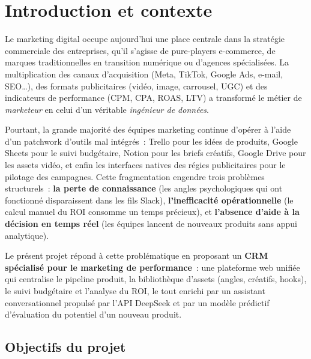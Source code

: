 \section{Introduction et contexte}
\label{sec:intro}

Le marketing digital occupe aujourd'hui une place centrale dans la stratégie
commerciale des entreprises, qu'il s'agisse de pure-players e-commerce, de
marques traditionnelles en transition numérique ou d'agences spécialisées. La
multiplication des canaux d'acquisition (Meta, TikTok, Google Ads, e-mail,
SEO\ldots), des formats publicitaires (vidéo, image, carrousel, UGC) et des
indicateurs de performance (CPM, CPA, ROAS, LTV) a transformé le métier de
\emph{marketeur} en celui d'un véritable \emph{ingénieur de données}.

Pourtant, la grande majorité des équipes marketing continue d'opérer à l'aide
d'un patchwork d'outils mal intégrés~: Trello pour les idées de produits,
Google Sheets pour le suivi budgétaire, Notion pour les briefs créatifs,
Google Drive pour les assets vidéo, et enfin les interfaces natives des régies
publicitaires pour le pilotage des campagnes. Cette fragmentation engendre
trois problèmes structurels~: \textbf{la perte de connaissance}
(les angles psychologiques qui ont fonctionné disparaissent dans les fils Slack),
\textbf{l'inefficacité opérationnelle} (le calcul manuel du ROI consomme un
temps précieux), et \textbf{l'absence d'aide à la décision en temps réel}
(les équipes lancent de nouveaux produits sans appui analytique).

Le présent projet répond à cette problématique en proposant un \textbf{CRM
spécialisé pour le marketing de performance}~: une plateforme web unifiée qui
centralise le pipeline produit, la bibliothèque d'assets (angles, créatifs,
hooks), le suivi budgétaire et l'analyse du ROI, le tout enrichi par un
assistant conversationnel propulsé par l'API DeepSeek et par un modèle
prédictif d'évaluation du potentiel d'un nouveau produit.

\subsection{Objectifs du projet}

